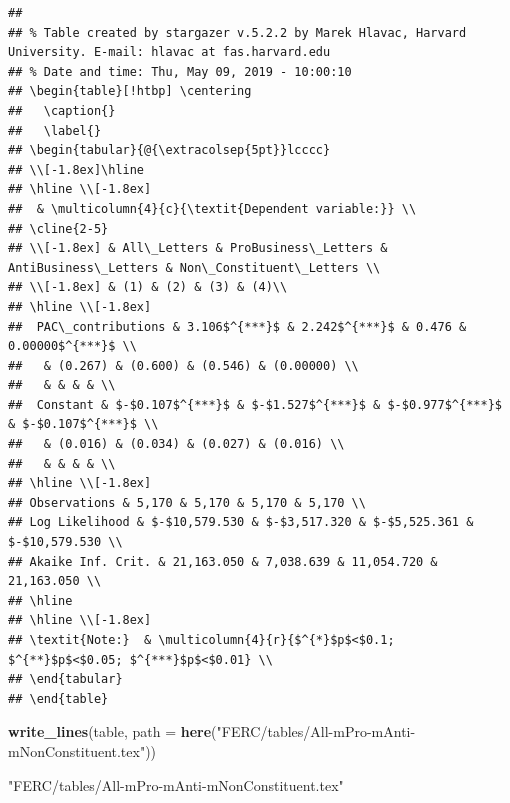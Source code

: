 \documentclass[]{article}
\newenvironment{Shaded}{\begin{snugshade}}{\end{snugshade}}
\newcommand{\KeywordTok}[1]{\textcolor[rgb]{0.13,0.29,0.53}{\textbf{#1}}}
\newcommand{\DataTypeTok}[1]{\textcolor[rgb]{0.13,0.29,0.53}{#1}}
\newcommand{\StringTok}[1]{\textcolor[rgb]{0.31,0.60,0.02}{#1}}
\newcommand{\NormalTok}[1]{#1}
\begin{document}
\begin{verbatim}
## 
## % Table created by stargazer v.5.2.2 by Marek Hlavac, Harvard University. E-mail: hlavac at fas.harvard.edu
## % Date and time: Thu, May 09, 2019 - 10:00:10
## \begin{table}[!htbp] \centering 
##   \caption{} 
##   \label{} 
## \begin{tabular}{@{\extracolsep{5pt}}lcccc} 
## \\[-1.8ex]\hline 
## \hline \\[-1.8ex] 
##  & \multicolumn{4}{c}{\textit{Dependent variable:}} \\ 
## \cline{2-5} 
## \\[-1.8ex] & All\_Letters & ProBusiness\_Letters & AntiBusiness\_Letters & Non\_Constituent\_Letters \\ 
## \\[-1.8ex] & (1) & (2) & (3) & (4)\\ 
## \hline \\[-1.8ex] 
##  PAC\_contributions & 3.106$^{***}$ & 2.242$^{***}$ & 0.476 & 0.00000$^{***}$ \\ 
##   & (0.267) & (0.600) & (0.546) & (0.00000) \\ 
##   & & & & \\ 
##  Constant & $-$0.107$^{***}$ & $-$1.527$^{***}$ & $-$0.977$^{***}$ & $-$0.107$^{***}$ \\ 
##   & (0.016) & (0.034) & (0.027) & (0.016) \\ 
##   & & & & \\ 
## \hline \\[-1.8ex] 
## Observations & 5,170 & 5,170 & 5,170 & 5,170 \\ 
## Log Likelihood & $-$10,579.530 & $-$3,517.320 & $-$5,525.361 & $-$10,579.530 \\ 
## Akaike Inf. Crit. & 21,163.050 & 7,038.639 & 11,054.720 & 21,163.050 \\ 
## \hline 
## \hline \\[-1.8ex] 
## \textit{Note:}  & \multicolumn{4}{r}{$^{*}$p$<$0.1; $^{**}$p$<$0.05; $^{***}$p$<$0.01} \\ 
## \end{tabular} 
## \end{table}
\end{verbatim}

\begin{Shaded}
\begin{Highlighting}[]
\KeywordTok{write_lines}\NormalTok{(table,}
  \DataTypeTok{path =} \KeywordTok{here}\NormalTok{(}\StringTok{"FERC/tables/All-mPro-mAnti-mNonConstituent.tex"}\NormalTok{))}

\StringTok{"FERC/tables/All-mPro-mAnti-mNonConstituent.tex"}
\end{Highlighting}
\end{Shaded}
\end{document}
